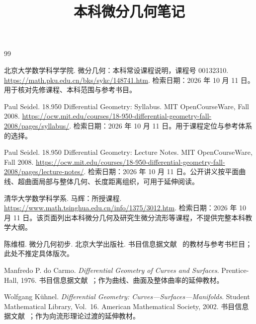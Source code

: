 \documentclass[UTF8,12pt,a4paper,fontset=fandol]{ctexbook}
\title{本科微分几何笔记}
\author{}
\date{}
\begin{document}
\frontmatter %

\maketitle
\tableofcontents


\mainmatter












\appendix


\backmatter
\begin{thebibliography}{99}

北京大学数学科学学院. 微分几何：本科常设课程说明，课程号 00132310.
\url{https://math.pku.edu.cn/bks/sykc/148741.htm}.
检索日期：2026 年 10 月 11 日。用于核对先修课程、本科范围与参考书目。

Paul Seidel. 18.950 Differential Geometry: Syllabus. MIT OpenCourseWare, Fall 2008.
\url{https://ocw.mit.edu/courses/18-950-differential-geometry-fall-2008/pages/syllabus/}.
检索日期：2026 年 10 月 11 日。用于课程定位与参考体系的选择。

Paul Seidel. 18.950 Differential Geometry: Lecture Notes. MIT OpenCourseWare, Fall 2008.
\url{https://ocw.mit.edu/courses/18-950-differential-geometry-fall-2008/pages/lecture-notes/}.
检索日期：2026 年 10 月 11 日。公开讲义按平面曲线、超曲面局部与整体几何、长度距离组织，可用于延伸阅读。

清华大学数学科学系. 马辉：所授课程.
\url{https://www.math.tsinghua.edu.cn/info/1375/3012.htm}.
检索日期：2026 年 10 月 11 日。该页面列出本科微分几何及研究生微分流形等课程，不提供完整本科教学大纲。

陈维桓. 微分几何初步. 北京大学出版社.
书目信息据文献~\cite{pku-course} 的教材与参考书栏目；此处不推定具体版次。

Manfredo P. do Carmo. \textit{Differential Geometry of Curves and Surfaces}.
Prentice-Hall, 1976.
书目信息据文献~\cite{mit-syllabus}；作为曲线、曲面及整体曲率的延伸教材。

Wolfgang K\"uhnel. \textit{Differential Geometry: Curves---Surfaces---Manifolds}.
Student Mathematical Library, Vol.~16. American Mathematical Society, 2002.
书目信息据文献~\cite{mit-syllabus}；作为向流形理论过渡的延伸教材。

\end{thebibliography}
\end{document}

